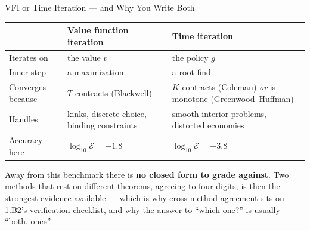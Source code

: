 \begin{frame}{VFI or Time Iteration --- and Why You Write Both}
\renewcommand{\arraystretch}{1.18}
\begin{center}\footnotesize
\begin{tabularx}{\linewidth}{@{}>{\raggedright\arraybackslash}p{2.6cm} >{\raggedright\arraybackslash}X >{\raggedright\arraybackslash}X@{}}
\toprule
 & \textbf{Value function iteration} & \textbf{Time iteration} \\
\midrule
Iterates on & the value $v$ & the policy $g$ \\
Inner step & a maximization & a root-find \\
Converges because & $T$ contracts (Blackwell) & $K$ contracts (Coleman) \emph{or} is monotone (Greenwood--Huffman) \\
Handles & kinks, discrete choice, binding constraints & smooth interior problems, distorted economies \\
Accuracy here & $\log_{10}\mathcal{E}=-1.8$ & $\log_{10}\mathcal{E}=-3.8$ \\
\bottomrule
\end{tabularx}
\end{center}
\vspace{1mm}
\begin{takeawaybox}\small
Away from this benchmark there is \textbf{no closed form to grade against}. Two methods that rest on different theorems, agreeing to four digits, is then the strongest evidence available --- which is why cross-method agreement sits on 1.B2's verification checklist, and why the answer to ``which one?'' is usually ``both, once''.
\end{takeawaybox}
\vspace{1mm}
\end{frame}

